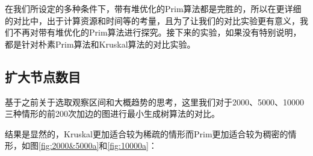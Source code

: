 \documentclass[UTF8]{ctexart}
\begin{document}
在我们所设定的多种条件下，带有堆优化的Prim算法都是完胜的，所以在更详细的对比中，出于计算资源和时间等的考量，且为了让我们的对比实验更有意义，我们不再对带有堆优化的Prim算法进行探究。接下来的实验，如果没有特别说明，都是针对朴素Prim算法和Kruskal算法的对比实验。

\subsection{扩大节点数目}
基于之前关于选取观察区间和大概趋势的思考，这里我们对于2000、5000、10000三种情形的前200次加边的图进行最小生成树算法的对比。

结果是显然的，Kruskal更加适合较为稀疏的情形而Prim更加适合较为稠密的情形，如图\ref{fig:2000&5000a}和\ref{fig:10000a}：
\begin{figure}[htbp]
    \centering


\end{figure}
\end{document}
